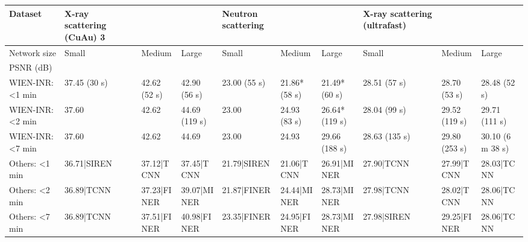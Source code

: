 \begin{tabular}{llllllllll}
\toprule
Dataset & X-ray scattering (CuAu) 3 &  &  & Neutron scattering &  &  & X-ray scattering (ultrafast) &  &  \\
\midrule
Network size & Small & Medium & Large & Small & Medium & Large & Small & Medium & Large \\
PSNR (dB) &  &  &  &  &  &  &  &  &  \\
WIEN-INR: <1 min & 37.45 (30 s) & 42.62 (52 s) & 42.90 (56 s) & 23.00 (55 s) & 21.86* (58 s) & 21.49* (60 s) & 28.51 (57 s) & 28.70 (53 s) & 28.48 (52 s) \\
WIEN-INR: <2 min & 37.60 & 42.62 & 44.69 (119 s) & 23.00 & 24.93 (83 s) & 26.64* (119 s) & 28.04 (99 s) & 29.52 (119 s) & 29.71 (111 s) \\
WIEN-INR: <7 min & 37.60 & 42.62 & 44.69 & 23.00 & 24.93 & 29.66 (188 s) & 28.63 (135 s) & 29.80 (253 s) & 30.10 (6 m 38 s) \\
Others: <1 min & 36.71|SIREN & 37.12|TCNN & 37.45|TCNN & 21.79|SIREN & 21.06|TCNN & 26.91|MINER & 27.90|TCNN & 27.99|TCNN & 28.03|TCNN \\
Others: <2 min & 36.89|TCNN & 37.23|FINER & 39.07|MINER & 21.87|FINER & 24.44|MINER & 28.73|MINER & 27.98|TCNN & 28.02|TCNN & 28.06|TCNN \\
Others: <7 min & 36.89|TCNN & 37.51|FINER & 40.98|FINER & 23.35|FINER & 24.95|FINER & 28.73|MINER & 27.98|SIREN & 29.25|FINER & 28.06|TCNN \\
\bottomrule
\end{tabular}
